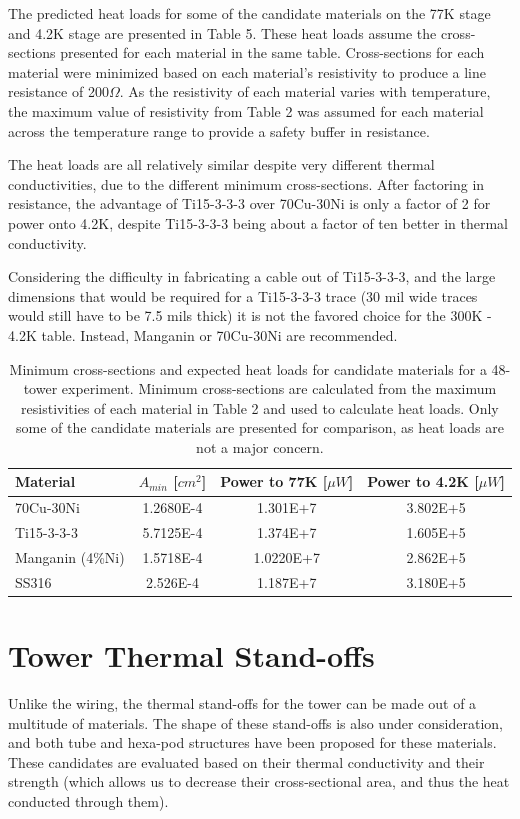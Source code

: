 \documentclass{article}
\begin{document}
The predicted heat loads for some of the candidate materials on the 77K stage and 4.2K stage are presented in Table 5. These heat loads assume the cross-sections presented for each material in the same table. Cross-sections for each material were minimized based on each material's resistivity to produce a line resistance of 200$\Omega$. As the resistivity of each material varies with temperature, the maximum value of resistivity from Table 2 was assumed for each material across the temperature range to provide a safety buffer in resistance.

The heat loads are all relatively similar despite very different thermal conductivities, due to the different minimum cross-sections. After factoring in resistance, the advantage of Ti15-3-3-3 over 70Cu-30Ni is only a factor of 2 for power onto 4.2K, despite Ti15-3-3-3 being about a factor of ten better in thermal conductivity.

Considering the difficulty in fabricating a cable out of Ti15-3-3-3, and the large dimensions that would be required for a Ti15-3-3-3 trace (30 mil wide traces would still have to be 7.5 mils thick) it is not the favored choice for the 300K - 4.2K table. Instead, Manganin or 70Cu-30Ni are recommended.

\begin{table}[h]
\centering
\begin{threeparttable}
\begin{tabular}{l|ccc}
\toprule
Material & $A_{min}$ [$cm^2$] & Power to 77K [$\mu W$] & Power to 4.2K [$\mu W$] \\
\midrule
70Cu-30Ni & 1.2680E-4 & 1.301E+7 & 3.802E+5 \\
Ti15-3-3-3 & 5.7125E-4 & 1.374E+7 & 1.605E+5 \\
Manganin (4\%Ni) & 1.5718E-4 & 1.0220E+7 & 2.862E+5 \\
SS316 & 2.526E-4 & 1.187E+7 & 3.180E+5 \\
\bottomrule
\end{tabular}
\end{threeparttable}
\caption{Minimum cross-sections and expected heat loads for candidate materials for a 48-tower experiment. Minimum cross-sections are calculated from the maximum resistivities of each material in Table 2 and used to calculate heat loads.  Only some of the candidate materials are presented for comparison, as heat loads are not a major concern.}
\end{table}


\section{Tower Thermal Stand-offs}
Unlike the wiring, the thermal stand-offs for the tower can be made out of a multitude of materials. The shape of these stand-offs is also under consideration, and both tube and hexa-pod structures have been proposed for these materials. These candidates are evaluated based on their thermal conductivity and their strength (which allows us to decrease their cross-sectional area, and thus the heat conducted through them).
\end{document}
